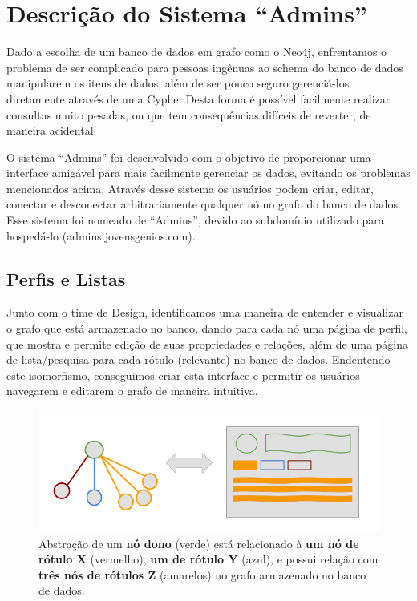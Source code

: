 \chapter{Descrição do Sistema ``Admins''}
\label{chap4}

Dado a escolha de um banco de dados em grafo como o Neo4j, enfrentamos o problema de ser complicado para pessoas ingênuas ao schema do banco de dados manipularem os itens de dados, além de ser pouco seguro gerenciá-los diretamente através de uma Cypher.Desta forma é possível facilmente realizar consultas muito pesadas, ou que tem consequências difíceis de reverter, de maneira acidental.

O sistema ``Admins'' foi desenvolvido com o objetivo de proporcionar uma interface amigável para mais facilmente gerenciar os dados, evitando os problemas mencionados acima. Através desse sistema os usuários podem criar, editar, conectar e desconectar arbitrariamente qualquer nó no grafo do banco de dados. Esse sistema foi nomeado de ``Admins'', devido ao subdomínio utilizado para hospedá-lo (admins.jovensgenios.com).

\section{Perfis e Listas}

Junto com o time de Design, identificamos uma maneira de entender e visualizar o grafo que está armazenado no banco, dando para cada nó uma página de perfil, que mostra e permite edição de suas propriedades e relações, além de uma página de lista/pesquisa para cada rótulo (relevante) no banco de dados. Endentendo este isomorfismo, conseguimos criar esta interface e permitir os usuários navegarem e editarem o grafo de maneira intuitiva.

\begin{figure}[H]
    \centering
    \includegraphics[width=1.0\linewidth]{Imagens/chap04/perfil-isomorfismo.png}
    \caption{Abstração de um \textbf{nó dono} (verde) está relacionado à \textbf{um nó de rótulo X} (vermelho), \textbf{um de rótulo Y} (azul), e possui relação com \textbf{três nós de rótulos Z} (amarelos) no grafo armazenado no banco de dados.}
    \label{fig:isomorphism}
\end{figure}

